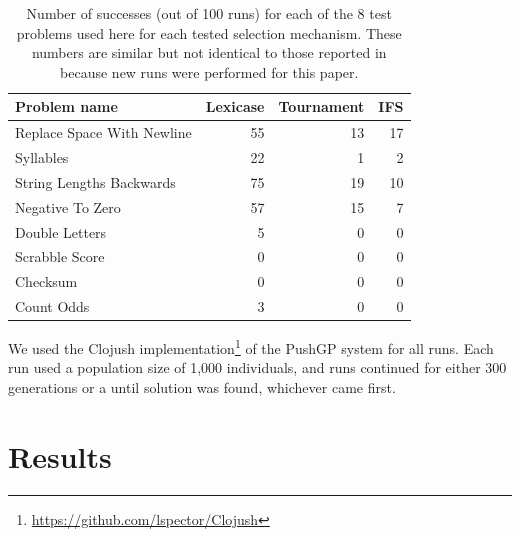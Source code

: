\begin{table}
\centering
	\caption{Number of successes (out of 100 runs) for each of the 8 test problems used here for each
		tested selection mechanism. These numbers are similar but not identical to those reported in 
		\cite{Helmuth:2015:GECCO} because new runs were performed for this paper.}
	\label{tab:successCounts}
	\begin{tabular}{lrrr}
		Problem name \quad & Lexicase \quad & Tournament \quad & IFS \\
		\hline
		Replace Space With Newline & 55 & 13 & 17 \\
		Syllables & 22 & 1 & 2 \\
		String Lengths Backwards & 75 & 19 & 10 \\
		Negative To Zero & 57 & 15 & 7 \\
		Double Letters & 5 & 0 & 0 \\
		Scrabble Score & 0 & 0 & 0 \\
		Checksum & 0 & 0 & 0 \\
		Count Odds & 3 & 0 & 0 \\
	\end{tabular}
\end{table}

We used the Clojush implementation\footnote{\url{https://github.com/lspector/Clojush}} 
of the PushGP system \citep{spector:2002:GPEM, 1068292} for all runs. Each run used a population size of 1,000 
individuals, and runs continued for either 300 generations or a until solution was found, whichever 
came first. 


\section{Results}
\label{sec:results}

